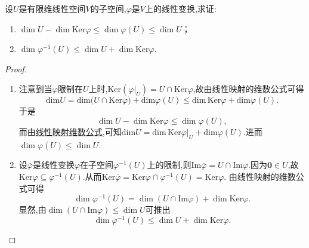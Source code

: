 \documentclass[lang=cn,newtx,10pt,scheme=chinese]{elegantbook}
\begin{document}
\begin{proposition}\label{proposition:线性变换关于子空间的维数不等式}
设\(U\)是有限维线性空间\(V\)的子空间,\(\varphi\)是\(V\)上的线性变换,求证:
\begin{enumerate}[(1)]
    \item \(\dim U-\dim\text{Ker}\varphi\leq\dim\varphi(U)\leq\dim U\)；

    \item \(\dim\varphi^{-1}(U)\leq\dim U+\dim\text{Ker}\varphi\).
\end{enumerate}
\end{proposition}
\begin{proof}
\begin{enumerate}[(1)]
    \item 注意到当\(\varphi\)限制在\(U\)上时,\(\text{Ker}(\varphi|_U)=U\cap\text{Ker}\varphi\),故由线性映射的维数公式可得
\[
\mathrm{dim}U=\mathrm{dim(}U\cap \mathrm{Ker}\varphi )+\mathrm{dim}\varphi (U)\leqslant \mathrm{dim}\,\mathrm{Ker}\varphi +\mathrm{dim}\varphi (U).
\]
于是
\[
\dim U - \dim\text{Ker}\varphi\leq\dim\varphi(U),
\]
而由\hyperref[proposition:值域和核空间维数之和等于原像空间维数]{线性映射维数公式},可知$\mathrm{dim}U=\mathrm{dim}\,\mathrm{Ker}\varphi |_U+\mathrm{dim}\varphi (U)$.进而\(\dim\varphi(U)\leq\dim U\).
    
    \item 设\(\overline{\varphi}\)是线性变换\(\varphi\)在子空间\(\varphi^{-1}(U)\)上的限制,则\(\text{Im}\overline{\varphi}=U\cap\text{Im}\varphi\).因为\(\boldsymbol{0}\in U\),故\(\text{Ker}\varphi\subseteq\varphi^{-1}(U)\).从而\(\text{Ker}\overline{\varphi}=\text{Ker}\varphi\cap\varphi^{-1}(U)=\text{Ker}\varphi\). 由线性映射的维数公式可得
\[
\dim\varphi^{-1}(U)=\dim(U\cap\text{Im}\varphi)+\dim\text{Ker}\varphi.
\]
显然,由\(\dim(U\cap\text{Im}\varphi)\leq\dim U\)可推出
\[
\dim\varphi^{-1}(U)\leq\dim U+\dim\text{Ker}\varphi. 
\]
\end{enumerate}
\end{proof}
\end{document}
